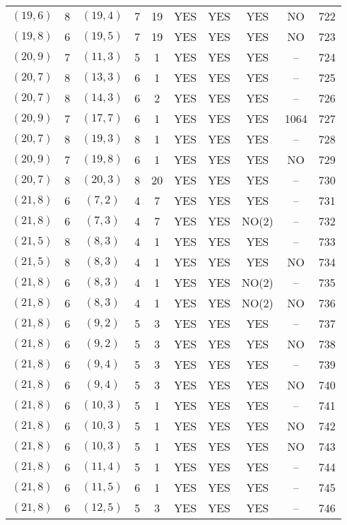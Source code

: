 \begin{longtable}{|c|c|c|c|c|c|c|c|c|c|}
$(19, 6)$ & 8 & $(19, 4)$ & 7 & 19 & YES & YES & YES & NO & 722\\
$(19, 8)$ & 6 & $(19, 5)$ & 7 & 19 & YES & YES & YES & NO & 723\\
$(20, 9)$ & 7 & $(11, 3)$ & 5 & 1 & YES & YES & YES & -- & 724\\
$(20, 7)$ & 8 & $(13, 3)$ & 6 & 1 & YES & YES & YES & -- & 725\\
$(20, 7)$ & 8 & $(14, 3)$ & 6 & 2 & YES & YES & YES & -- & 726\\
$(20, 9)$ & 7 & $(17, 7)$ & 6 & 1 & YES & YES & YES & 1064 & 727\\
$(20, 7)$ & 8 & $(19, 3)$ & 8 & 1 & YES & YES & YES & -- & 728\\
$(20, 9)$ & 7 & $(19, 8)$ & 6 & 1 & YES & YES & YES & NO & 729\\
$(20, 7)$ & 8 & $(20, 3)$ & 8 & 20 & YES & YES & YES & -- & 730\\
$(21, 8)$ & 6 & $(7, 2)$ & 4 & 7 & YES & YES & YES & -- & 731\\
$(21, 8)$ & 6 & $(7, 3)$ & 4 & 7 & YES & YES & NO(2) & -- & 732\\
$(21, 5)$ & 8 & $(8, 3)$ & 4 & 1 & YES & YES & YES & -- & 733\\
$(21, 5)$ & 8 & $(8, 3)$ & 4 & 1 & YES & YES & YES & NO & 734\\
$(21, 8)$ & 6 & $(8, 3)$ & 4 & 1 & YES & YES & NO(2) & -- & 735\\
$(21, 8)$ & 6 & $(8, 3)$ & 4 & 1 & YES & YES & NO(2) & NO & 736\\
$(21, 8)$ & 6 & $(9, 2)$ & 5 & 3 & YES & YES & YES & -- & 737\\
$(21, 8)$ & 6 & $(9, 2)$ & 5 & 3 & YES & YES & YES & NO & 738\\
$(21, 8)$ & 6 & $(9, 4)$ & 5 & 3 & YES & YES & YES & -- & 739\\
$(21, 8)$ & 6 & $(9, 4)$ & 5 & 3 & YES & YES & YES & NO & 740\\
$(21, 8)$ & 6 & $(10, 3)$ & 5 & 1 & YES & YES & YES & -- & 741\\
$(21, 8)$ & 6 & $(10, 3)$ & 5 & 1 & YES & YES & YES & NO & 742\\
$(21, 8)$ & 6 & $(10, 3)$ & 5 & 1 & YES & YES & YES & NO & 743\\
$(21, 8)$ & 6 & $(11, 4)$ & 5 & 1 & YES & YES & YES & -- & 744\\
$(21, 8)$ & 6 & $(11, 5)$ & 6 & 1 & YES & YES & YES & -- & 745\\
$(21, 8)$ & 6 & $(12, 5)$ & 5 & 3 & YES & YES & YES & -- & 746\\

\end{longtable}
